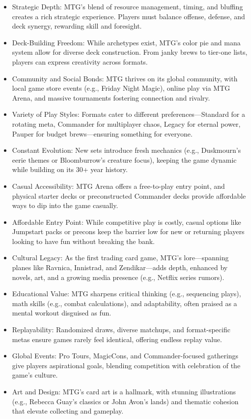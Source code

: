 \begin{itemize}
\item Strategic Depth: MTG’s blend of resource management, timing, and bluffing creates a rich strategic experience. Players must balance offense, defense, and deck synergy, rewarding skill and foresight.
\item Deck-Building Freedom: While archetypes exist, MTG’s color pie and mana system allow for diverse deck construction. From janky brews to tier-one lists, players can express creativity across formats.
\item Community and Social Bonds: MTG thrives on its global community, with local game store events (e.g., Friday Night Magic), online play via MTG Arena, and massive tournaments fostering connection and rivalry.
\item Variety of Play Styles: Formats cater to different preferences—Standard for a rotating meta, Commander for multiplayer chaos, Legacy for eternal power, Pauper for budget brews—ensuring something for everyone.
\item Constant Evolution: New sets introduce fresh mechanics (e.g., Duskmourn’s eerie themes or Bloomburrow’s creature focus), keeping the game dynamic while building on its 30+ year history.
\item Casual Accessibility: MTG Arena offers a free-to-play entry point, and physical starter decks or preconstructed Commander decks provide affordable ways to dip into the game casually.
\item Affordable Entry Point: While competitive play is costly, casual options like Jumpstart packs or precons keep the barrier low for new or returning players looking to have fun without breaking the bank.
\item Cultural Legacy: As the first trading card game, MTG’s lore—spanning planes like Ravnica, Innistrad, and Zendikar—adds depth, enhanced by novels, art, and a growing media presence (e.g., Netflix series rumors).
\item Educational Value: MTG sharpens critical thinking (e.g., sequencing plays), math skills (e.g., combat calculations), and adaptability, often praised as a mental workout disguised as fun.
\item Replayability: Randomized draws, diverse matchups, and format-specific metas ensure games rarely feel identical, offering endless replay value.
\item Global Events: Pro Tours, MagicCons, and Commander-focused gatherings give players aspirational goals, blending competition with celebration of the game’s culture.
\item Art and Design: MTG’s card art is a hallmark, with stunning illustrations (e.g., Rebecca Guay’s classics or John Avon’s lands) and thematic cohesion that elevate collecting and gameplay.
\end{itemize}


